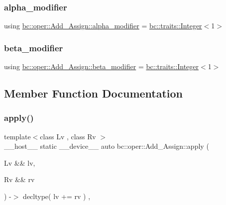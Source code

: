 \subsubsection{\texorpdfstring{alpha\+\_\+modifier}{alpha\_modifier}}
{\footnotesize\ttfamily using \hyperlink{structbc_1_1oper_1_1Add__Assign_a608f4b132e9a48c01de612acac5af87e}{bc\+::oper\+::\+Add\+\_\+\+Assign\+::alpha\+\_\+modifier} =  \hyperlink{structbc_1_1traits_1_1Integer}{bc\+::traits\+::\+Integer}$<$1$>$}

\mbox{\label{structbc_1_1oper_1_1Add__Assign_a2ad8892dba37c039d7a82b674c126bf0}} 
\subsubsection{\texorpdfstring{beta\+\_\+modifier}{beta\_modifier}}
{\footnotesize\ttfamily using \hyperlink{structbc_1_1oper_1_1Add__Assign_a2ad8892dba37c039d7a82b674c126bf0}{bc\+::oper\+::\+Add\+\_\+\+Assign\+::beta\+\_\+modifier} =  \hyperlink{structbc_1_1traits_1_1Integer}{bc\+::traits\+::\+Integer}$<$1$>$}



\subsection{Member Function Documentation}
\mbox{\label{structbc_1_1oper_1_1Add__Assign_ac908f04769926c30ab8763d5748dee4b}} 
\subsubsection{\texorpdfstring{apply()}{apply()}}
{\footnotesize\ttfamily template$<$class Lv , class Rv $>$ \\
\+\_\+\+\_\+host\+\_\+\+\_\+ static \+\_\+\+\_\+device\+\_\+\+\_\+ auto bc\+::oper\+::\+Add\+\_\+\+Assign\+::apply (\begin{DoxyParamCaption}\item[{Lv \&\&}]{lv,  }\item[{Rv \&\&}]{rv }\end{DoxyParamCaption}) -\/$>$ decltype( lv += rv ) \hspace{0.3cm}{\ttfamily [inline]}, {\ttfamily [static]}}

